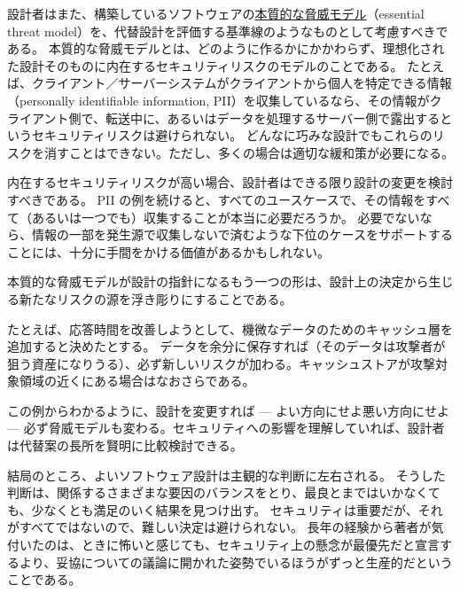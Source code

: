 \documentclass[uplatex]{jsarticle}
\def\label#1{}%
\begin{document}
設計者はまた、構築しているソフトウェアの\underline{本質的な脅威モデル}（essential threat model）を、代替設計を評価する基準線のようなものとして考慮すべきである。
本質的な脅威モデルとは、どのように作るかにかかわらず、理想化された設計そのものに内在するセキュリティリスクのモデルのことである。
たとえば、クライアント／サーバーシステムがクライアントから個人を特定できる情報（personally identifiable information, PII）を収集しているなら、その情報がクライアント側で、転送中に、あるいはデータを処理するサーバー側で露出するというセキュリティリスクは避けられない。
どんなに巧みな設計でもこれらのリスクを消すことはできない。ただし、多くの場合は適切な緩和策が必要になる。

内在するセキュリティリスクが高い場合、設計者はできる限り設計の変更を検討すべきである。
PII の例を続けると、すべてのユースケースで、その情報をすべて（あるいは一つでも）収集することが本当に必要だろうか。
必要でないなら、情報の一部を発生源で収集しないで済むような下位のケースをサポートすることには、十分に手間をかける価値があるかもしれない。

本質的な脅威モデルが設計の指針になるもう一つの形は、設計上の決定から生じる新たなリスクの源を浮き彫りにすることである。

\begin{exa}[機微なデータのキャッシュ層]\label{exa:ch6-cache-layer}
たとえば、応答時間を改善しようとして、機微なデータのためのキャッシュ層を追加すると決めたとする。
データを余分に保存すれば（そのデータは攻撃者が狙う資産になりうる）、必ず新しいリスクが加わる。キャッシュストアが攻撃対象領域の近くにある場合はなおさらである。
\end{exa}

この例からわかるように、設計を変更すれば --- よい方向にせよ悪い方向にせよ --- 必ず脅威モデルも変わる。セキュリティへの影響を理解していれば、設計者は代替案の長所を賢明に比較検討できる。

結局のところ、よいソフトウェア設計は主観的な判断に左右される。
そうした判断は、関係するさまざまな要因のバランスをとり、最良とまではいかなくても、少なくとも満足のいく結果を見つけ出す。
セキュリティは重要だが、それがすべてではないので、難しい決定は避けられない。
長年の経験から著者が気付いたのは、ときに怖いと感じても、セキュリティ上の懸念が最優先だと宣言するより、妥協についての議論に開かれた姿勢でいるほうがずっと生産的だということである。
\end{document}

